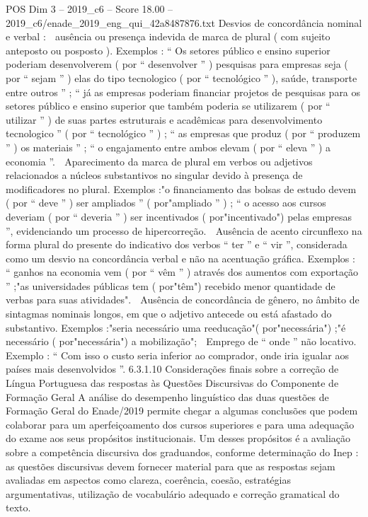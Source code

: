 \begin{textsample}{POS Dim 3 – 2019\_c6 – Score 18.00 – 2019\_c6/enade\_2019\_eng\_qui\_42a8487876.txt}
Desvios de concordância nominal e verbal :  ausência ou presença indevida de marca de plural ( com sujeito anteposto ou posposto ).
Exemplos : “ Os setores público e ensino superior poderiam desenvolverem ( por “ desenvolver ” ) pesquisas para empresas seja ( por “ sejam ” ) elas do tipo tecnologico ( por “ tecnológico ” ), saúde, transporte entre outros ” ; “ já as empresas poderiam financiar projetos de pesquisas para os setores público e ensino superior que também poderia se utilizarem ( por “ utilizar ” ) de suas partes estruturais e acadêmicas para desenvolvimento tecnologico ” ( por “ tecnológico ” ) ; “ as empresas que produz ( por “ produzem ” ) os materiais ” ; “ o engajamento entre ambos elevam ( por “ eleva ” ) a economia ”.  Aparecimento da marca de plural em verbos ou adjetivos relacionados a núcleos substantivos no singular devido à presença de modificadores no plural.
Exemplos :"o financiamento das bolsas de estudo devem ( por “ deve ” ) ser ampliados ” ( por"ampliado ” ) ; “ o acesso aos cursos deveriam ( por “ deveria ” ) ser incentivados ( por"incentivado") pelas empresas ”, evidenciando um processo de hipercorreção.  Ausência de acento circunflexo na forma plural do presente do indicativo dos verbos “ ter ” e “ vir ”, considerada como um desvio na concordância verbal e não na acentuação gráfica.
Exemplos : “ ganhos na economia vem ( por “ vêm ” ) através dos aumentos com exportação ” ;"as universidades públicas tem ( por"têm") recebido menor quantidade de verbas para suas atividades".  Ausência de concordância de gênero, no âmbito de sintagmas nominais longos, em que o adjetivo antecede ou está afastado do substantivo.
Exemplos :"seria necessário uma reeducação"( por"necessária") ;"é necessário ( por"necessária") a mobilização";  Emprego de “ onde ” não locativo.
Exemplo : “ Com isso o custo seria inferior ao comprador, onde iria igualar aos países mais desenvolvidos ”. 6.3.1.10 Considerações finais sobre a correção de Língua Portuguesa das respostas às Questões Discursivas do Componente de Formação Geral A análise do desempenho linguístico das duas questões de Formação Geral do Enade/2019 permite chegar a algumas conclusões que podem colaborar para um aperfeiçoamento dos cursos superiores e para uma adequação do exame aos seus propósitos institucionais.
Um desses propósitos é a avaliação sobre a competência discursiva dos graduandos, conforme determinação do Inep : as questões discursivas devem fornecer material para que as respostas sejam avaliadas em aspectos como clareza, coerência, coesão, estratégias argumentativas, utilização de vocabulário adequado e correção gramatical do texto.

\end{textsample}
